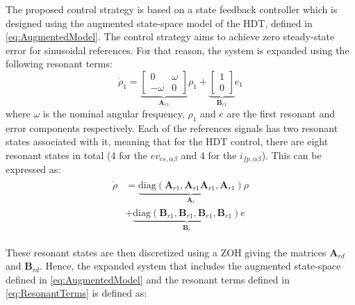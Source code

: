 The proposed control strategy is based on a state feedback controller which is designed using the augmented state-space model of the HDT, defined in \eqref{eq:AugmentedModel}. The control strategy aims to achieve zero steady-state error for sinusoidal references. For that reason, the system is expanded using the following resonant terms:
\begin{equation}
    \dot{\rho}_1 = 
    \underbrace{
    \begin{bmatrix}
        0 & \omega \\
        -\omega & 0
    \end{bmatrix}
    }_{\mathbf{A}_{r1}}
    \rho_1 + 
    \underbrace{
    \begin{bmatrix}
        1\\
        0
    \end{bmatrix}
    }_{\mathbf{B}_{r1}}
    e_1
\end{equation}
where $\omega$ is the nominal angular frequency, $\rho_1$ and $e$ are the first resonant and error components respectively. Each of the references signals has two resonant states associated with it, meaning that for the HDT control, there are eight resonant states in total (4 for the $ev_{cs,\alpha\beta}$ and 4 for the $i_{fp,\alpha\beta}$). This can be expressed as:
\begin{align}
    \begin{aligned}
        \dot{\rho} &= \underbrace{\text{diag}(\mathbf{A}_{r1}, \mathbf{A}_{r1} \mathbf{A}_{r1}, \mathbf{A}_{r1})}_{\mathbf{A}_{r}}\rho\\
        &+ \underbrace{\text{diag}(\mathbf{B}_{r1}, \mathbf{B}_{r1}, \mathbf{B}_{r1}, \mathbf{B}_{r1})}_{\mathbf{B}_{r}}e\label{eq:ResonantTerms}
    \end{aligned}
\end{align}

These resonant states are then discretized using a ZOH giving the matrices $\mathbf{A}_{rd}$ and $\mathbf{B}_{rd}$. Hence, the expanded system that includes the augmented state-space defined in \eqref{eq:AugmentedModel} and the resonant terms defined in \eqref{eq:ResonantTerms} is defined as:

